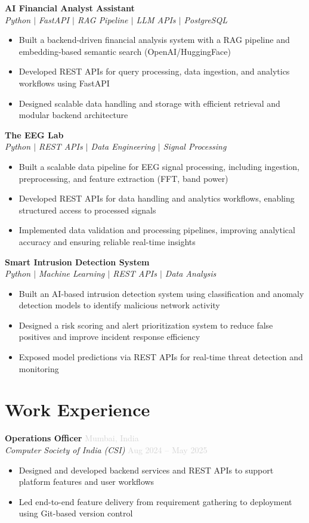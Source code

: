 \documentclass[10pt, a4paper]{article}
\newcommand{\resumeEntry}[4]{%
  \noindent\textbf{#1} \hfill \textcolor{lightgray}{#3} \\
  \textit{#2} \hfill \textcolor{lightgray}{#4}
  \vspace{1pt}
}
\newcommand{\projectEntry}[2]{%
  \noindent\textbf{#1} \\
  \textit{#2}
  \vspace{1pt}
}
\begin{document}
\projectEntry{AI Financial Analyst Assistant}{Python $|$ FastAPI $|$ RAG Pipeline $|$ LLM APIs $|$ PostgreSQL}
\begin{itemize}
  \item Built a backend-driven financial analysis system with a RAG pipeline and embedding-based semantic search (OpenAI/HuggingFace)
  \item Developed REST APIs for query processing, data ingestion, and analytics workflows using FastAPI
  \item Designed scalable data handling and storage with efficient retrieval and modular backend architecture
\end{itemize}

\projectEntry{The EEG Lab}{Python $|$ REST APIs $|$ Data Engineering $|$ Signal Processing}
\begin{itemize}
  \item Built a scalable data pipeline for EEG signal processing, including ingestion, preprocessing, and feature extraction (FFT, band power)
  \item Developed REST APIs for data handling and analytics workflows, enabling structured access to processed signals
  \item Implemented data validation and processing pipelines, improving analytical accuracy and ensuring reliable real-time insights
\end{itemize}

\projectEntry{Smart Intrusion Detection System}{Python $|$ Machine Learning $|$ REST APIs $|$ Data Analysis}
\begin{itemize}
  \item Built an AI-based intrusion detection system using classification and anomaly detection models to identify malicious network activity
  \item Designed a risk scoring and alert prioritization system to reduce false positives and improve incident response efficiency
  \item Exposed model predictions via REST APIs for real-time threat detection and monitoring
\end{itemize}

\section{Work Experience}

\resumeEntry
  {Operations Officer}
  {Computer Society of India (CSI)}
  {Mumbai, India}
  {Aug 2024 -- May 2025}
\begin{itemize}
  \item Designed and developed backend services and REST APIs to support platform features and user workflows
  \item Led end-to-end feature delivery from requirement gathering to deployment using Git-based version control
\end{itemize}
\end{document}
